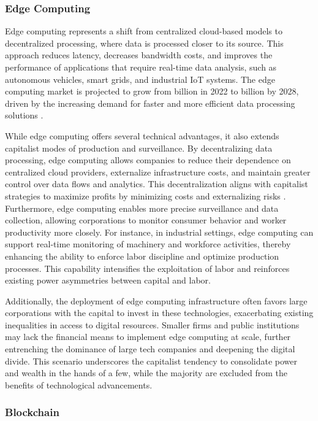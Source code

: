 \begin{refsection}
\subsubsection{Edge Computing}

Edge computing represents a shift from centralized cloud-based models to decentralized processing, where data is processed closer to its source. This approach reduces latency, decreases bandwidth costs, and improves the performance of applications that require real-time data analysis, such as autonomous vehicles, smart grids, and industrial IoT systems. The edge computing market is projected to grow from  billion in 2022 to  billion by 2028, driven by the increasing demand for faster and more efficient data processing solutions \cite[pp.~7-10]{shi2022edge}.

While edge computing offers several technical advantages, it also extends capitalist modes of production and surveillance. By decentralizing data processing, edge computing allows companies to reduce their dependence on centralized cloud providers, externalize infrastructure costs, and maintain greater control over data flows and analytics. This decentralization aligns with capitalist strategies to maximize profits by minimizing costs and externalizing risks \cite[pp.~20-22]{satyanarayanan2017emergence}. Furthermore, edge computing enables more precise surveillance and data collection, allowing corporations to monitor consumer behavior and worker productivity more closely. For instance, in industrial settings, edge computing can support real-time monitoring of machinery and workforce activities, thereby enhancing the ability to enforce labor discipline and optimize production processes. This capability intensifies the exploitation of labor and reinforces existing power asymmetries between capital and labor.

Additionally, the deployment of edge computing infrastructure often favors large corporations with the capital to invest in these technologies, exacerbating existing inequalities in access to digital resources. Smaller firms and public institutions may lack the financial means to implement edge computing at scale, further entrenching the dominance of large tech companies and deepening the digital divide. This scenario underscores the capitalist tendency to consolidate power and wealth in the hands of a few, while the majority are excluded from the benefits of technological advancements.

\subsubsection{Blockchain}


\end{refsection}
